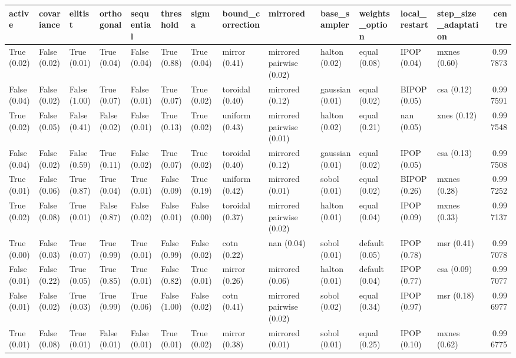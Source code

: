 \begin{tabular}{lllllllllllllr}
\toprule
active & covariance & elitist & orthogonal & sequential & threshold & sigma & bound_correction & mirrored & base_sampler & weights_option & local_restart & step_size_adaptation & centre \\
\midrule
True (0.02) & False (0.02) & True (0.01) & True (0.04) & False (0.04) & True (0.88) & True (0.04) & mirror (0.41) & mirrored pairwise (0.02) & halton (0.02) & equal (0.08) & IPOP (0.04) & mxnes (0.60) & 0.997873 \\
False (0.04) & False (0.02) & False (1.00) & True (0.07) & False (0.01) & True (0.07) & True (0.02) & toroidal (0.40) & mirrored (0.12) & gaussian (0.01) & equal (0.02) & BIPOP (0.05) & csa (0.12) & 0.997591 \\
True (0.02) & False (0.05) & False (0.41) & False (0.02) & False (0.01) & True (0.13) & True (0.02) & uniform (0.43) & mirrored pairwise (0.01) & halton (0.02) & equal (0.21) & nan (0.05) & xnes (0.12) & 0.997548 \\
False (0.04) & False (0.02) & False (0.59) & True (0.11) & False (0.02) & True (0.07) & True (0.02) & toroidal (0.40) & mirrored (0.12) & gaussian (0.01) & equal (0.02) & IPOP (0.05) & csa (0.13) & 0.997508 \\
True (0.01) & False (0.06) & True (0.87) & True (0.04) & True (0.01) & False (0.09) & True (0.19) & uniform (0.42) & mirrored (0.01) & sobol (0.01) & equal (0.02) & BIPOP (0.26) & mxnes (0.28) & 0.997252 \\
True (0.02) & False (0.08) & True (0.01) & False (0.87) & False (0.02) & False (0.01) & False (0.00) & toroidal (0.37) & mirrored pairwise (0.02) & halton (0.01) & equal (0.04) & IPOP (0.09) & mxnes (0.33) & 0.997137 \\
True (0.00) & False (0.03) & True (0.07) & True (0.99) & True (0.01) & False (0.99) & False (0.02) & cotn (0.22) & nan (0.04) & sobol (0.01) & default (0.05) & IPOP (0.78) & msr (0.41) & 0.997078 \\
False (0.01) & False (0.22) & True (0.05) & True (0.85) & True (0.01) & False (0.82) & True (0.01) & mirror (0.26) & mirrored (0.06) & halton (0.01) & default (0.04) & IPOP (0.77) & csa (0.09) & 0.997077 \\
False (0.01) & False (0.02) & True (0.03) & True (0.99) & True (0.06) & False (1.00) & False (0.02) & cotn (0.41) & mirrored pairwise (0.02) & sobol (0.02) & equal (0.34) & IPOP (0.97) & msr (0.18) & 0.996977 \\
True (0.01) & False (0.08) & True (0.01) & False (0.01) & False (0.01) & True (0.01) & True (0.02) & mirror (0.38) & mirrored (0.01) & sobol (0.01) & equal (0.25) & IPOP (0.10) & mxnes (0.62) & 0.996775 \\

\end{tabular}
